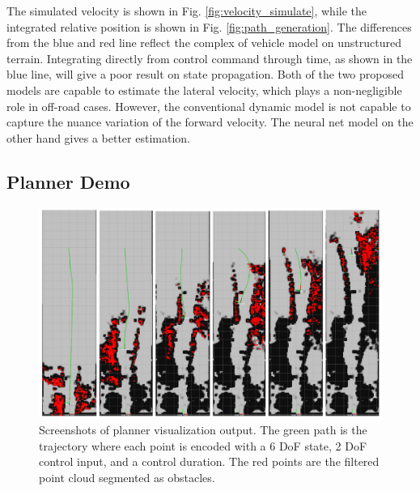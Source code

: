 \documentclass[../thesis.tex]{subfiles}
\begin{document}
The simulated velocity is shown in Fig. \ref{fig:velocity_simulate}, while the integrated relative position is shown in Fig. \ref{fig:path_generation}. The differences from the blue and red line reflect the complex of vehicle model on unstructured terrain. Integrating directly from control command through time, as shown in the blue line, will give a poor result on state propagation. Both of the two proposed models are capable to estimate the lateral velocity, which plays a non-negligible role in off-road cases. However, the conventional dynamic model is not capable to capture the nuance variation of the forward velocity. The neural net model on the other hand gives a better estimation.



\subsection{Planner Demo}

\begin{figure}[t]
	\begin{center}
		\centerline{\includegraphics[width=0.8\columnwidth]{./RRTPlanner/fig/demo.png}}
		\caption{Screenshots of planner visualization output. The green path is the trajectory where each point is encoded with a 6 DoF state, 2 DoF control input, and a control duration. The red points are the filtered point cloud segmented as obstacles.}
		\label{fig:demo}
	\end{center}
\end{figure} 
\end{document}
